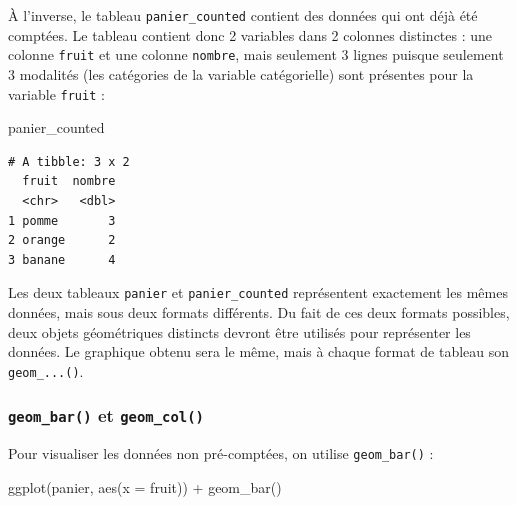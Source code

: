 \documentclass[
  a4paper,
  DIV=11,
  numbers=noendperiod,
  oneside]{scrreprt}
\newenvironment{Shaded}{}{}
\newcommand{\AttributeTok}[1]{\textcolor[rgb]{0.84,0.23,0.29}{#1}}
\newcommand{\FunctionTok}[1]{\textcolor[rgb]{0.44,0.26,0.76}{#1}}
\newcommand{\NormalTok}[1]{\textcolor[rgb]{0.14,0.16,0.18}{#1}}
\newcommand{\SpecialCharTok}[1]{\textcolor[rgb]{0.00,0.36,0.77}{#1}}
\begin{document}
À l'inverse, le tableau \texttt{panier\_counted} contient des données
qui ont déjà été comptées. Le tableau contient donc 2 variables dans 2
colonnes distinctes : une colonne \texttt{fruit} et une colonne
\texttt{nombre}, mais seulement 3 lignes puisque seulement 3 modalités
(les catégories de la variable catégorielle) sont présentes pour la
variable \texttt{fruit} :

\begin{Shaded}
\begin{Highlighting}[]
\NormalTok{panier\_counted}
\end{Highlighting}
\end{Shaded}

\begin{verbatim}
# A tibble: 3 x 2
  fruit  nombre
  <chr>   <dbl>
1 pomme       3
2 orange      2
3 banane      4
\end{verbatim}

Les deux tableaux \texttt{panier} et \texttt{panier\_counted}
représentent exactement les mêmes données, mais sous deux formats
différents. Du fait de ces deux formats possibles, deux objets
géométriques distincts devront être utilisés pour représenter les
données. Le graphique obtenu sera le même, mais à chaque format de
tableau son \texttt{geom\_...()}.

\subsubsection{\texorpdfstring{\texttt{geom\_bar()} et
\texttt{geom\_col()}}{geom\_bar() et geom\_col()}}\label{geom_bar-et-geom_col}

Pour visualiser les données non pré-comptées, on utilise
\texttt{geom\_bar()} :

\begin{Shaded}
\begin{Highlighting}[]
\FunctionTok{ggplot}\NormalTok{(panier, }\FunctionTok{aes}\NormalTok{(}\AttributeTok{x =}\NormalTok{ fruit)) }\SpecialCharTok{+}
  \FunctionTok{geom\_bar}\NormalTok{()}
\end{Highlighting}
\end{Shaded}
\end{document}
